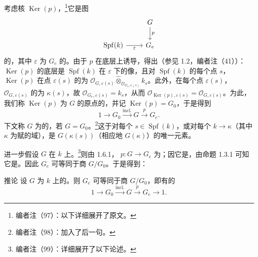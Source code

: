 考虑核 $\operatorname{Ker}(p)$，\footnote{编者注（97）：以下详细展开了原文。}它是图
\[
\begin{tikzcd}
&G\arrow[d,"p"]\\
\operatorname{Spf}(k)\arrow[r,"\varepsilon"']&G_e
\end{tikzcd}
\]
的，其中 $\varepsilon$ 为 $G_e$ 的。由于 $p$ 在底层上诱导，得出（参见 1.2，编者注（41））：$\operatorname{Ker}(p)$ 的底层是 $\operatorname{Spf}(k)$ 在 $\varepsilon$ 下的像，且对 $\operatorname{Spf}(k)$ 的每个点 $s$，$\operatorname{Ker}(p)$ 在点 $\varepsilon(s)$ 的为 $\mathscr O_{G,\varepsilon(s)}\widehat\otimes_{\mathscr O_{G_e,\varepsilon(s)}}k_s$。此外，在每个点 $\varepsilon(s)$，$\mathscr O_{G,\varepsilon(s)}$ 的为 $\kappa(s)$，故 $\mathscr O_{G_e,\varepsilon(s)}=k_s$，从而 $\mathscr O_{\operatorname{Ker}(p),\varepsilon(s)}=\mathscr O_{G,\varepsilon(s)}$。为此，
我们称 $\operatorname{Ker}(p)$ 为 $G$ 的原点的，并记 $\operatorname{Ker}(p)=G_0$，于是得到
\[
1\longrightarrow G_0\xrightarrow{\mathrm{incl.}}G\xrightarrow{p}G_e.
\]
下文称 $G$ 为的，若 $G=G_0$。\footnote{编者注（98）：加入了后一句。}这于对每个 $s\in\operatorname{Spf}(k)$，或对每个 $k\to\kappa$（其中 $\kappa$ 为赋的域），是 $G(\kappa(s))$（相应地 $G(\kappa)$）的唯一元素。

进一步假设 $G$ 在 $k$ 上。\footnote{编者注（99）：详细展开了以下论述。}则由 1.6.1， $p:G\to G_e$ 为；因它是，由命题 1.3.1 可知它是。因此 $G_e$ 可等同于商 $G/G_0$。于是得到：
\begin{SGAresult}{推论}{}
设 $G$ 为 $k$ 上的。则 $G_e$ 可等同于商 $G/G_0$，即有的
\[
1\longrightarrow G_0\xrightarrow{\mathrm{incl.}}G\xrightarrow{p}G_e\longrightarrow1.
\]
\end{SGAresult}

